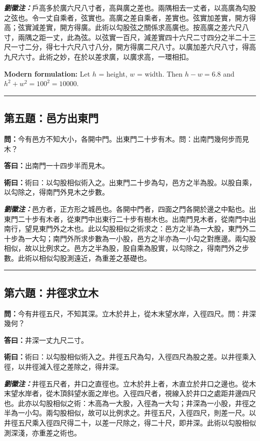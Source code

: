 \documentclass[11pt,a4paper]{article}
\newcommand{\wen}[1]{\textbf{\color{problemcolor}問：}#1\par}
\newcommand{\da}[1]{\textbf{答曰：}#1\par}
\newcommand{\shu}[1]{\textbf{術曰：}#1\par}
\newcommand{\liuhui}[1]{{\color{commentarycolor}\textit{\textbf{劉徽注：}}#1\par}}
\begin{document}
\liuhui{戶高多於廣六尺八寸者，高與廣之差也。兩隅相去一丈者，以高廣為勾股之弦也。令一丈自乘者，弦實也。高廣之差自乘者，差實也。弦實加差實，開方得高；弦實減差實，開方得廣。此術以勾股弦之關係求高廣也。按高廣之差六尺八寸，兩隅之距一丈，此為弦。以弦實一百尺，減差實四十六尺二寸四分之半二十三尺一寸二分，得七十六尺八寸八分，開方得廣二尺八寸。以廣加差六尺八寸，得高九尺六寸。此術之妙，在於以差求廣，以廣求高，一環相扣。}

\textbf{Modern formulation:} Let $h$ = height, $w$ = width. Then $h - w = 6.8$ and $h^2 + w^2 = 100^2 = 10000$.

\bigskip
\hrule
\bigskip

\subsection{第五題：邑方出東門}

\wen{今有邑方不知大小，各開中門。出東門二十步有木。問：出南門幾何步而見木？}

\da{出南門一十四步半而見木。}

\shu{術曰：以勾股相似術入之。出東門二十步為勾，邑方之半為股。以股自乘，以勾除之，得南門外見木之步數。}

\liuhui{邑方者，正方形之城邑也。各開中門者，四面之門各開於邊之中點也。出東門二十步有木者，從東門中出東行二十步有樹木也。出南門見木者，從南門中出南行，望見東門外之木也。此以勾股相似之術求之：邑方之半為一大股，東門外二十步為一大勾；南門外所求步數為一小股，邑方之半亦為一小勾之對應邊。兩勾股相似，故以比例求之。邑方之半為股，股自乘為股實，以勾除之，得南門外之步數。此術以相似勾股測遠近，為重差之基礎也。}

\bigskip
\hrule
\bigskip

\subsection{第六題：井徑求立木}

\wen{今有井徑五尺，不知其深。立木於井上，從木末望水岸，入徑四尺。問：井深幾何？}

\da{井深一丈九尺二寸。}

\shu{術曰：以勾股相似術入之。井徑五尺為勾，入徑四尺為股之差。以井徑乘入徑，以井徑減入徑之差除之，得井深。}

\liuhui{井徑五尺者，井口之直徑也。立木於井上者，木直立於井口之邊也。從木末望水岸者，從木頂斜望水面之岸也。入徑四尺者，視線入於井口之處距井邊四尺也。此亦以勾股相似之術：木高為一大股，入徑為一大勾；井深為一小股，井徑之半為一小勾。兩勾股相似，故可以比例求之。井徑五尺，入徑四尺，則差一尺。以井徑五尺乘入徑四尺得二十，以差一尺除之，得二十尺，即井深。此術以勾股相似測深淺，亦重差之術也。}
\end{document}
